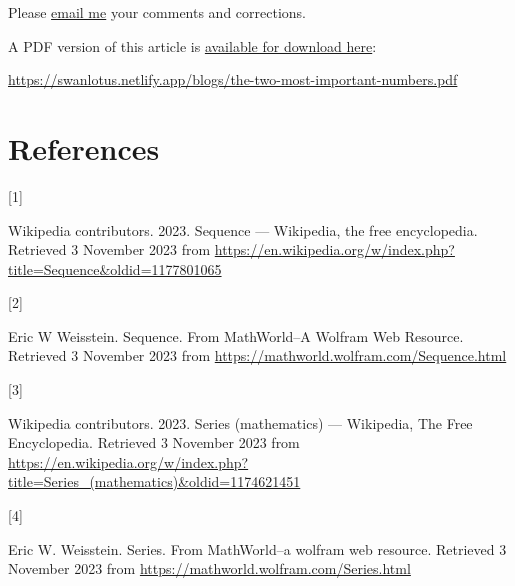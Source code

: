\documentclass[
  a4paper,
]{article}
\newlength{\cslhangindent}
\newlength{\csllabelwidth}
\newlength{\cslentryspacingunit} %
\newenvironment{CSLReferences}[2] %
 {%
  \setlength{\parindent}{0pt}
  \ifodd #1
  \let\oldpar\par
  \def\par{\hangindent=\cslhangindent\oldpar}
  \fi
  \setlength{\parskip}{#2\cslentryspacingunit}
 }%
 {}
\newcommand{\CSLLeftMargin}[1]{\parbox[t]{\csllabelwidth}{#1}}
\newcommand{\CSLRightInline}[1]{\parbox[t]{\linewidth - \csllabelwidth}{#1}\break}
\begin{document}
Please \href{mailto:feedback.swanlotus@gmail.com}{email me} your
comments and corrections.

\noindent A PDF version of this article is
\href{./the-two-most-important-numbers.pdf}{available for download
here}:

\begin{small}

\begin{sffamily}

\url{https://swanlotus.netlify.app/blogs/the-two-most-important-numbers.pdf}

\end{sffamily}

\end{small}

\hypertarget{bibliography}{%
\section*{References}\label{bibliography}}

\hypertarget{refs}{}
\begin{CSLReferences}{0}{0}
\leavevmode{}%
\CSLLeftMargin{{[}1{]} }%
\CSLRightInline{Wikipedia contributors. 2023. Sequence ---
{Wikipedia}{,} the free encyclopedia. Retrieved 3 November 2023 from
\url{https://en.wikipedia.org/w/index.php?title=Sequence\&oldid=1177801065}}

\leavevmode{}%
\CSLLeftMargin{{[}2{]} }%
\CSLRightInline{Eric W Weisstein. {Sequence. From MathWorld--A Wolfram
Web Resource}. Retrieved 3 November 2023 from
\url{https://mathworld.wolfram.com/Sequence.html}}

\leavevmode{}%
\CSLLeftMargin{{[}3{]} }%
\CSLRightInline{Wikipedia contributors. 2023. {Series (mathematics) ---
{Wikipedia}{,} The Free Encyclopedia}. Retrieved 3 November 2023 from
\url{https://en.wikipedia.org/w/index.php?title=Series_(mathematics)\&oldid=1174621451}}

\leavevmode{}%
\CSLLeftMargin{{[}4{]} }%
\CSLRightInline{Eric W. Weisstein. Series. From MathWorld--a wolfram web
resource. Retrieved 3 November 2023 from
\url{https://mathworld.wolfram.com/Series.html}}

\end{CSLReferences}
\end{document}
